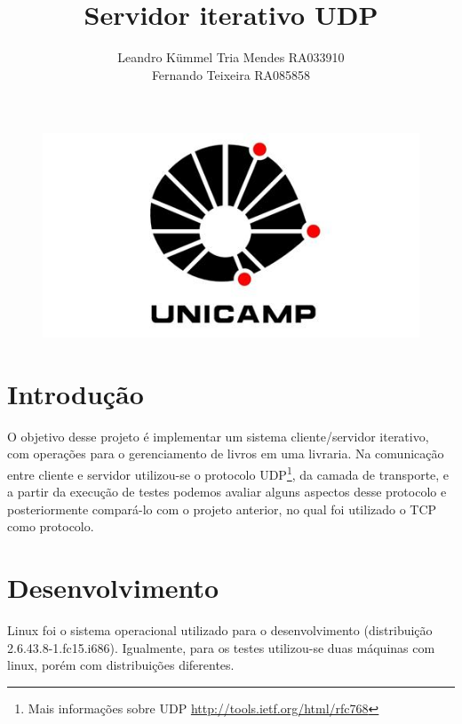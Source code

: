 \documentclass[a4paper,10pt]{article}
\title{Servidor iterativo UDP}
\author{Leandro Kümmel Tria Mendes RA033910 \\ Fernando Teixeira RA085858}
\begin{document}
\maketitle
\begin{figure}[!htb]
  \centering
  \includegraphics[scale=0.5]{logo.jpg}
\end{figure}
\newpage
\tableofcontents
\listoffigures
\listoftables
\newpage
\section{Introdução}
O objetivo desse projeto é implementar um sistema cliente/servidor
iterativo, com operações para o gerenciamento de livros em uma livraria.
Na comunicação entre cliente e servidor utilizou-se o protocolo UDP\footnote{
Mais informações sobre UDP \url{http://tools.ietf.org/html/rfc768} }, da camada de transporte, e a partir da execução de testes podemos avaliar alguns aspectos
desse protocolo e posteriormente compará-lo com o projeto anterior, no qual foi utilizado o TCP como protocolo.
\section{Desenvolvimento}
Linux foi o sistema operacional utilizado para o desenvolvimento (distribuição
2.6.43.8-1.fc15.i686). Igualmente, para os testes utilizou-se duas máquinas com linux, porém com distribuições diferentes.
\end{document}
